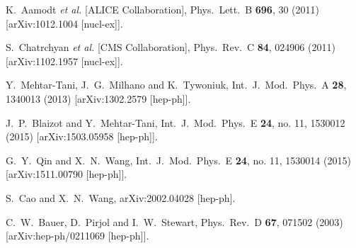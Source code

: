 \documentclass[letter,11pt]{article}
\begin{document}
\begin{thebibliography}{99}
  K.~Aamodt {\it et al.} [ALICE Collaboration],
  Phys.\ Lett.\ B {\bf 696}, 30 (2011)
  [arXiv:1012.1004 [nucl-ex]].

  S.~Chatrchyan {\it et al.} [CMS Collaboration],
  Phys.\ Rev.\ C {\bf 84}, 024906 (2011)
  [arXiv:1102.1957 [nucl-ex]].
  
  Y.~Mehtar-Tani, J.~G.~Milhano and K.~Tywoniuk,
  Int.\ J.\ Mod.\ Phys.\ A {\bf 28}, 1340013 (2013)
  [arXiv:1302.2579 [hep-ph]].

  J.~P.~Blaizot and Y.~Mehtar-Tani,
  Int.\ J.\ Mod.\ Phys.\ E {\bf 24}, no. 11, 1530012 (2015)
  [arXiv:1503.05958 [hep-ph]].

  G.~Y.~Qin and X.~N.~Wang,
  Int.\ J.\ Mod.\ Phys.\ E {\bf 24}, no. 11, 1530014 (2015)
  [arXiv:1511.00790 [hep-ph]].

  S.~Cao and X.~N.~Wang,
  arXiv:2002.04028 [hep-ph].


C.~W.~Bauer, D.~Pirjol and I.~W.~Stewart,
Phys.\ Rev.\ D \textbf{67}, 071502 (2003)
[arXiv:hep-ph/0211069 [hep-ph]].


\end{thebibliography}
\end{document}
